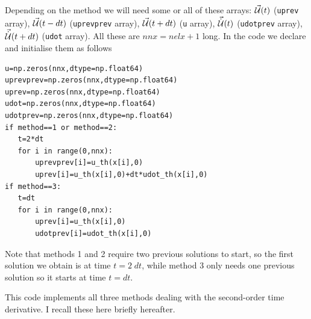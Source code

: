Depending on the method we will need some or all of these arrays:
$\vec{\cal U}(t)$ (\lstinline|uprev| array), 
$\vec{\cal U}(t-dt)$ (\lstinline|uprevprev| array), 
$\vec{\cal U}(t+dt)$ (\lstinline|u| array), 
$\vec{\dot{{\cal U}}}(t)$ (\lstinline|udotprev| array), 
$\vec{\dot{{\cal U}}}(t+dt)$ (\lstinline|udot| array).
All these are $nnx=nelx+1$ long. 
In the code we declare and initialise them as follows 
\begin{lstlisting}
u=np.zeros(nnx,dtype=np.float64)    
uprevprev=np.zeros(nnx,dtype=np.float64) 
uprev=np.zeros(nnx,dtype=np.float64)     
udot=np.zeros(nnx,dtype=np.float64)      
udotprev=np.zeros(nnx,dtype=np.float64) 
if method==1 or method==2:
   t=2*dt
   for i in range(0,nnx):
       uprevprev[i]=u_th(x[i],0)
       uprev[i]=u_th(x[i],0)+dt*udot_th(x[i],0)
if method==3:
   t=dt
   for i in range(0,nnx):
       uprev[i]=u_th(x[i],0)
       udotprev[i]=udot_th(x[i],0)
\end{lstlisting}

Note that methods 1 and 2 require two previous solutions to start, so
the first solution we obtain is at time $t=2\; dt$, while method 3
only needs one previous solution so it starts at time $t=dt$.

This code implements all three methods dealing with the second-order time derivative. 
I recall these here briefly hereafter.

